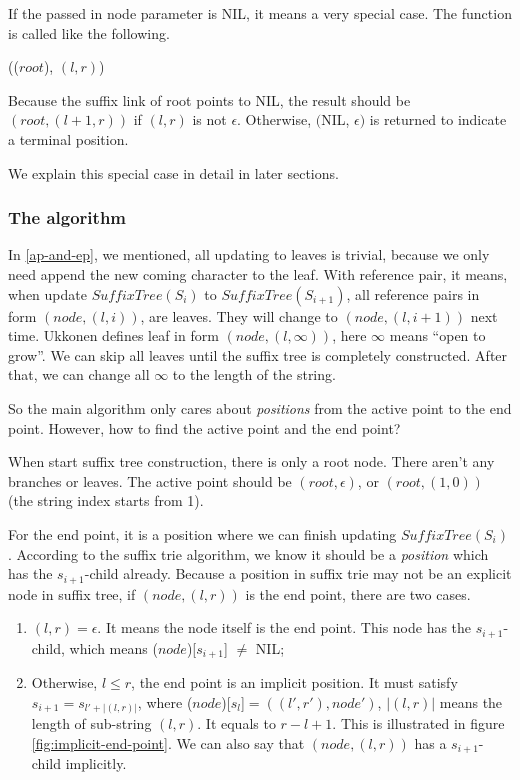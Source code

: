\documentclass{article}
\begin{document}
If the passed in node parameter is NIL, it means a very special case.
The function is called like the following.

(($root$), $(l, r)$)

Because the suffix link of root points to NIL, the result should be
$(root, (l+1, r))$ if $(l, r)$ is not $\epsilon$. Otherwise,
$($NIL, $\epsilon)$ is returned to indicate a terminal position.

We explain this special case in detail in later sections.

\subsubsection{The algorithm}

In \ref{ap-and-ep}, we mentioned, all updating to leaves is trivial, because we
only need append the new coming character to the leaf. With reference pair,
it means, when update $SuffixTree(S_i)$ to $SuffixTree(S_{i+1})$,
all reference pairs in form $(node, (l, i))$, are leaves. They will
change to $(node, (l, i+1))$ next time. Ukkonen defines leaf in form
$(node, (l, \infty))$, here $\infty$ means ``open to grow''. We can skip all
leaves until the suffix tree is completely constructed. After that, we can
change all $\infty$ to the length of the string.

So the main algorithm only cares about {\em positions} from the active point
to the end point. However, how to find the active point and the end point?

When start suffix tree construction, there is only a root node. There aren't
any branches or leaves. The active point should be $(root, \epsilon)$, or
$(root, (1, 0))$ (the string index starts from 1).

For the end point, it is a position where we can finish updating $SuffixTree(S_i)$.
According to the suffix trie algorithm, we know it should be a
{\em position} which has the $s_{i+1}$-child already. Because a position
in suffix trie may not be an explicit node in suffix tree, if $(node, (l, r))$
is the end point, there are two cases.

\begin{enumerate}
\item $(l, r)=\epsilon$. It means the node itself is the end point. This node has the
$s_{i+1}$-child, which means ($node$)[$s_{i+1}$] $\neq$ NIL;
\item Otherwise, $l \leq r$, the end point is an implicit position.
It must satisfy $s_{i+1}=s_{l'+|(l, r)|}$, where
($node$)[$s_l$]$=((l', r'), node')$, $|(l, r)|$ means
the length of sub-string $(l, r)$. It equals to $r-l+1$.
This is illustrated in figure \ref{fig:implicit-end-point}. We can
also say that $(node, (l, r))$ has a $s_{i+1}$-child implicitly.
\end{enumerate}
\end{document}
